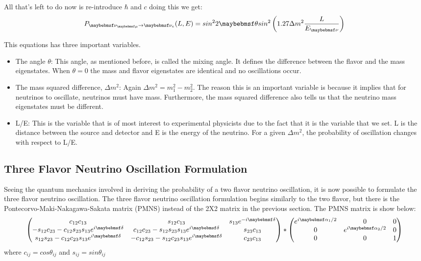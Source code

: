  All that's left to do now is re-introduce $\hbar$ and $c$ doing this we get:
 \begin{equation}
 \centering
 P_{\nu_{\mu} \rightarrow \nu_{e}} (L,E) = sin^{2}2\theta sin^2\left(1.27 \Delta m^2 \frac{L}{E_{\nu}}\right)
 \end{equation}
 
 This equations has three important variables. 
 \begin{itemize}
 \item The angle $\theta$: This angle, as mentioned before, is called the mixing angle. It defines the difference between the flavor and the mass eigenstates. When $\theta = 0$ the mass and flavor eigenstates are identical and no oscillations occur. 
 \item The mass squared difference, $\Delta m^2$: Again $\Delta m^2 = m^2_{1}-m^2_{2}$. The reason this is an important variable is because it implies that for neutrinos to oscillate, neutrinos must have mass. Furthermore, the mass squared difference also tells us that the neutrino mass eigenstates must be different. 
 \item L/E: This is the variable that is of most interest to experimental physicists due to the fact that it is the variable that we set. L is the distance between the source and detector and E is the energy of the neutrino. For a given $\Delta m^2$, the probability of oscillation changes with respect to L/E. 
 \end{itemize}

\subsection{Three Flavor Neutrino Oscillation Formulation}
Seeing the quantum mechanics involved in deriving the probability of a two flavor neutrino oscillation, it is now possible to formulate the three flavor neutrino oscillation. The three flavor neutrino oscillation formulation begins  similarly to the two flavor, but there is the Pontecorvo-Maki-Nakagawa-Sakata matrix (PMNS) instead of the 2X2 matrix in the previous section. The PMNS matrix is show below:
\begin{equation}
\centering
\begin{pmatrix}
c_{12}c_{13} & s_{12}c_{13} & s_{13}e^{-i \delta} \\
-s_{12}c_{23} - c_{12}s_{23}s_{13}e^{i \delta} & c_{12}c_{23} -s_{12}s_{23}s_{13}e^{i \delta} & s_{23}c_{13}\\
s_{12}s_{23} - c_{12}c_{23}s_{13}e^{i \delta} & -c_{12}s_{23} - s_{12}c_{23}s_{13}e^{i \delta} & c_{23}c_{13}
\end{pmatrix} *
\begin{pmatrix}
e^{i \alpha_{1}/2} & 0 & 0\\
0 & e^{i \alpha_{2}/2} & 0\\
0 & 0 &1
\end{pmatrix}
\end{equation} 
where $c_{ij}=cos\theta_{ij}$ and $s_{ij}=sin\theta_{ij}$

